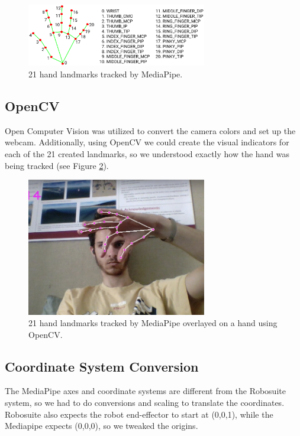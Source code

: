 \documentclass{article}
\begin{document}
\begin{figure}[H]
  \centering
  \includegraphics[width=0.7\textwidth]{../assets/hand_landmarks.png}
  \caption{21 hand landmarks tracked by MediaPipe.}
  \label{fig:hand-landmarks}
\end{figure}
\subsection{OpenCV}
Open Computer Vision was utilized to convert the camera colors and set up the
webcam. Additionally, using OpenCV we could create the visual indicators for
each of the 21 created landmarks, so we understood exactly how the hand was
being tracked (see Figure \ref{fig:hand-landmarks-webcam}).
\begin{figure}[H]
  \centering
  \includegraphics[width=0.7\textwidth]{../assets/hand-landmarks-webcam.jpeg}
  \caption{21 hand landmarks tracked by MediaPipe overlayed on a hand using OpenCV.}
  \label{fig:hand-landmarks-webcam}
\end{figure}
\subsection{Coordinate System Conversion}
The MediaPipe axes and coordinate systems are different from the Robosuite
system, so we had to do conversions and scaling to translate the coordinates.
Robosuite also expects the robot end-effector to start at (0,0,1), while the
Mediapipe expects (0,0,0), so we tweaked the origins. 
\end{document}
